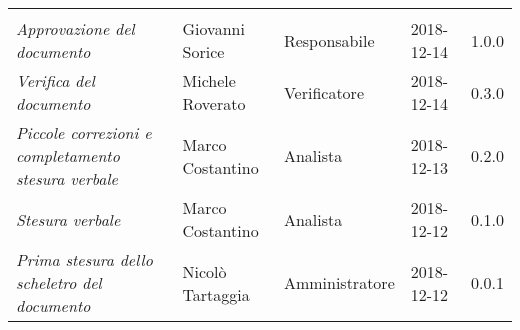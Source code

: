 \newpage 
\section*{}
\begin{table}[H]
	\centering
	\begin{tabular}{p{4cm}|C{3cm}|C{3cm}|R{2.5cm}|R{2cm}}
		
		 & & & & \\
		
		
		\emph{Approvazione del documento} & Giovanni Sorice & Responsabile & 2018-12-14 & 1.0.0 \\
		\hline
		
		\emph{Verifica del documento} & Michele Roverato & Verificatore & 2018-12-14 & 0.3.0 \\
		\hline

		\emph{Piccole correzioni e completamento stesura verbale} & Marco Costantino & Analista & 2018-12-13 & 0.2.0 \\
		\hline

		\emph{Stesura verbale} & Marco Costantino & Analista & 2018-12-12 & 0.1.0 \\
		\hline
		
		\emph{Prima stesura dello scheletro del documento} & Nicolò Tartaggia & Amministratore & 2018-12-12 & 0.0.1 \\
		
	\end{tabular}
	
\end{table}


\clearpage